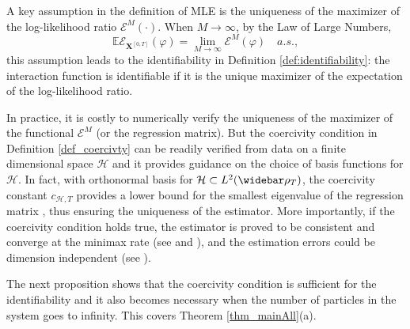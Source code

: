 \documentclass[]{elsarticle}
\def\E{\mathbb{E}}
\newcommand{\wbar}\widebar
\newcommand{\mbf}[1]{\boldsymbol{#1}}
\newcommand{\bX}{\mbf{X}}
\newcommand{\intkernelvar}{\varphi}
\newcommand{\hypspace}{\mathcal{H}}
\numberwithin{equation}{section}
\numberwithin{theorem}{section}
\begin{document}
A key assumption in the definition of MLE is the uniqueness of the maximizer of the log-likelihood ratio $\mathcal{E}^M(\cdot)$.   When $M\to\infty$, by the Law of Large Numbers, 
\[
\E\mathcal{E}_{\bX^{[0,T]}}(\intkernelvar)= \lim_{M\to \infty} \mathcal{E}^M(\intkernelvar)\quad a.s.,
\]
this assumption leads to the identifiability in Definition \ref{def:identifiability}:  the interaction function is identifiable if it is the unique maximizer of the expectation of the log-likelihood ratio. 


In practice, it is costly to numerically verify the uniqueness of the maximizer of the functional $\mathcal{E}^M$ (or the regression matrix). But the coercivity condition in Definition \ref{def_coercivty} can be readily verified from data on a finite dimensional space $\hypspace$ and it provides guidance on the choice of basis functions for $\hypspace$. In fact, with orthonormal basis for  $\hypspace \subset L^2(\wbar \rho_T)$, the coercivity constant $c_{\hypspace,T}$ provides a lower bound for the smallest eigenvalue of the regression matrix \cite{LMT19,LMT20}, thus ensuring the uniqueness of the estimator. More importantly, if the coercivity condition holds true, the estimator is proved to be consistent and converge at the minimax rate (see \cite[Theorem 5--6]{LMT19} and \cite[Theorem 3.1--3.2]{LMT20}), and the estimation errors could be dimension independent (see \cite[Theorem 9]{LMT19}). 


The next proposition shows that the coercivity condition is sufficient for the identifiability and it also becomes necessary when the number of particles in the system goes to infinity. This covers Theorem \ref{thm_mainAll}(a). 
\end{document}
